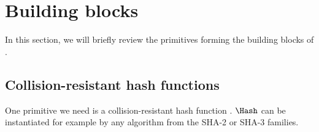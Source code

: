 \section{Building blocks}%
\label{Primitives}\label{building-blocks}

In this section, we will briefly review the primitives forming the building blocks of \CROCUS.

\subsection{Collision-resistant hash functions}

One primitive we need is a collision-resistant hash function \Hash.
\(\Hash\) can be instantiated for example by any algorithm from the SHA-2 or SHA-3 families.










